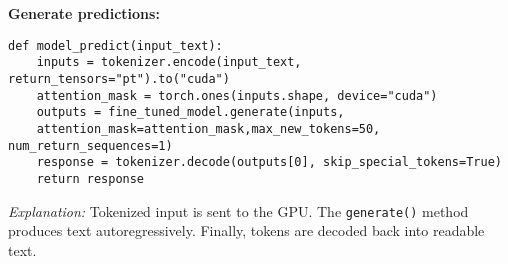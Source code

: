 \documentclass[a4paper, 12pt]{article}
\begin{document}
\begin{tcolorbox}[colback=yellow!5!white, colframe=yellow!80!black, title=\textbf{Generating Text with the Fine-tuned Model}, 
                  coltitle=black, fonttitle=\bfseries, enhanced, sharp corners, boxrule=1pt]
    \textbf{Generate predictions:}
    \begin{verbatim}
def model_predict(input_text):
    inputs = tokenizer.encode(input_text, return_tensors="pt").to("cuda")
    attention_mask = torch.ones(inputs.shape, device="cuda")
    outputs = fine_tuned_model.generate(inputs, 
    attention_mask=attention_mask,max_new_tokens=50, num_return_sequences=1)
    response = tokenizer.decode(outputs[0], skip_special_tokens=True)   
    return response

    \end{verbatim}
    \textit{Explanation:} Tokenized input is sent to the GPU. The \texttt{generate()} 
    method produces text autoregressively. Finally, tokens are decoded back into readable text.

\end{tcolorbox}
\end{document}
